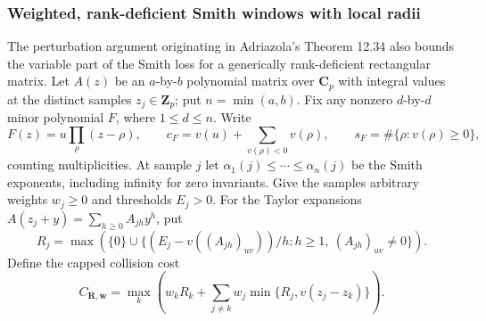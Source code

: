 \subsubsection{Weighted, rank-deficient Smith windows with local radii}
\label{sec:adriazola-smith-radii}
The perturbation argument originating in Adriazola's Theorem 12.34
\cite{adriazola-reconstruction} also bounds the variable part of the
Smith loss for a generically rank-deficient rectangular matrix.
Let \(A(z)\) be an \(a\)-by-\(b\) polynomial matrix over \(\mathbf C_p\)
with integral values at the distinct samples \(z_j\in\mathbf Z_p\);
put \(n=\min(a,b)\). Fix any nonzero \(d\)-by-\(d\) minor polynomial
\(F\), where \(1\le d\le n\). Write
\[
 F(z)=u\prod_\rho(z-\rho),\qquad
 c_F=v(u)+\sum_{v(\rho)<0}v(\rho),\qquad
 s_F=\#\{\rho:v(\rho)\ge0\},
\]
counting multiplicities. At sample \(j\) let
\(\alpha_1(j)\le\cdots\le\alpha_n(j)\) be the Smith exponents,
including infinity for zero invariants. Give the samples arbitrary
weights \(w_j\ge0\) and thresholds \(E_j>0\).
For the Taylor expansions \(A(z_j+y)=\sum_{h\ge0}A_{jh}y^h\), put
\[
 R_j=\max\left(\{0\}\cup
     \{(E_j-v((A_{jh})_{uv}))/h:
                     h\ge1,\ (A_{jh})_{uv}\ne0\}\right).
\]
Define the capped collision cost
\[
 C_{\mathbf R,\mathbf w}=
 \max_k\left(w_kR_k+\sum_{j\ne k}w_j
                       \min\{R_j,v(z_j-z_k)\}\right).
\]

